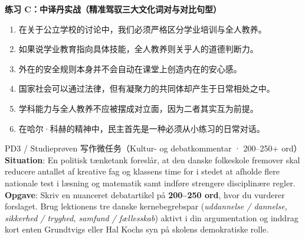 \textbf{练习 C：中译丹实战（精准驾驭三大文化词对与对比句型）}
\begin{enumerate}
  \item 在关于公立学校的讨论中，我们必须严格区分学业培训与全人教养。
  \item 如果说学业教育指向具体技能，全人教养则关乎人的道德判断力。
  \item 外在的安全规则本身并不会自动在课堂上创造内在的安心感。
  \item 国家社会可以通过法律，但有凝聚力的共同体却产生于日常相处之中。
  \item 学科能力与全人教养不应被摆成对立面，因为二者其实互为前提。
  \item 在哈尔·科赫的精神中，民主首先是一种必须从小练习的日常对话。
\end{enumerate}


\begin{emailbox}{PD3 / Studieprøven 写作微任务（Kultur- og debatkommentar · 200--250+ ord）}
\textbf{Situation}: En politisk tænketank foreslår, at den danske folkeskole fremover skal reducere antallet af kreative fag og klassens time for i stedet at afholde flere nationale test i læsning og matematik samt indføre strengere disciplinære regler.\\[3pt]
\textbf{Opgave}: Skriv en nuanceret debatartikel på \textbf{200--250 ord}, hvor du vurderer forslaget. Brug lektionens tre danske kernebegrebspar (\textit{uddannelse / dannelse, sikkerhed / tryghed, samfund / fællesskab}) aktivt i din argumentation og inddrag kort enten Grundtvigs eller Hal Kochs syn på skolens demokratiske rolle.
\end{emailbox}

